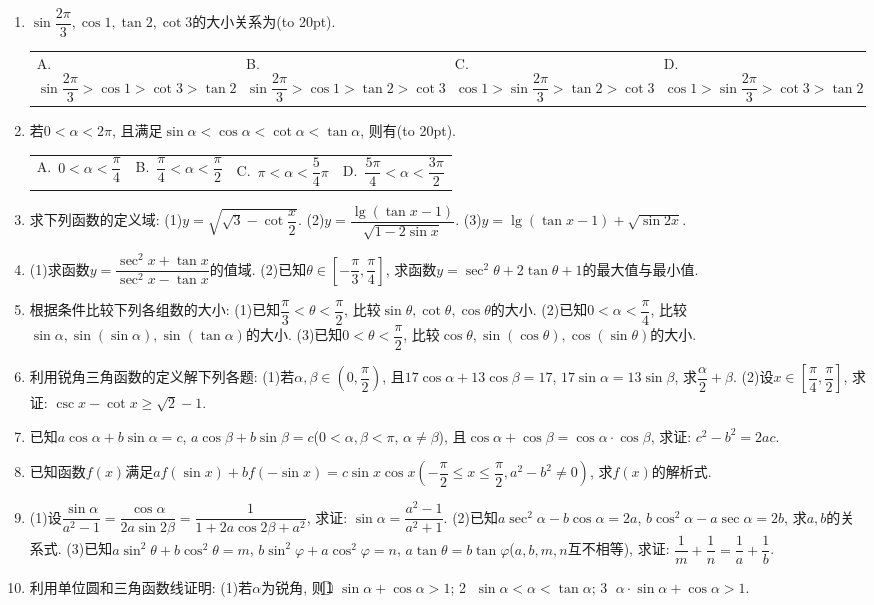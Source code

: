 \documentclass[10pt,a4paper]{article}
\newcommand{\bracket}[1]{(\hbox to #1pt{})}
\newcommand{\fourch}[4]{\par\begin{tabular}{p{.23\textwidth}p{.23\textwidth}p{.23\textwidth}p{.23\textwidth}}
A.~#1 &B.~#2& C.~#3& D.~#4
\end{tabular}}
\begin{document}
\begin{enumerate}[1.]
\item $\sin \dfrac{2\pi}3,\cos 1,\tan 2,\cot 3$的大小关系为\bracket{20}.
\fourch{$\sin \dfrac{2\pi}3>\cos 1>\cot 3>\tan 2$}{$\sin \dfrac{2\pi}3>\cos 1>\tan 2>\cot 3$}{$\cos 1>\sin \dfrac{2\pi}3>\tan 2>\cot 3$}{$\cos 1>\sin \dfrac{2\pi}3>\cot 3>\tan 2$}
\item 若$0<\alpha <2\pi$, 且满足$\sin \alpha <\cos \alpha <\cot \alpha <\tan \alpha$, 则有\bracket{20}.
\fourch{$0<\alpha <\dfrac{\pi}4$}{$\dfrac{\pi}4<\alpha <\dfrac{\pi}2$}{$\pi <\alpha <\dfrac 54\pi$}{$\dfrac{5\pi}4<\alpha <\dfrac{3\pi}2$}
\item 求下列函数的定义域:
(1)$y=\sqrt {\sqrt 3-\cot \dfrac x2}$.
(2)$y=\dfrac{\lg (\tan x-1)}{\sqrt {1-2\sin x}}$.
(3)$y=\lg (\tan x-1)+\sqrt {\sin 2x}$.
\item (1)求函数$y=\dfrac{\sec ^2x+\tan x}{\sec ^2x-\tan x}$的值域.
(2)已知$\theta \in [-\dfrac{\pi}3,\dfrac{\pi}4]$, 求函数$y=\sec ^2\theta +2\tan \theta +1$的最大值与最小值.
\item 根据条件比较下列各组数的大小:
(1)已知$\dfrac{\pi}3<\theta <\dfrac{\pi}2$, 比较$\sin \theta ,\cot \theta ,\cos \theta$的大小.
(2)已知$0<\alpha <\dfrac{\pi}4$, 比较$\sin \alpha ,\sin (\sin \alpha),\sin (\tan \alpha)$的大小.
(3)已知$0<\theta <\dfrac{\pi}2$, 比较$\cos \theta ,\sin (\cos \theta),\cos (\sin \theta)$的大小.
\item 利用锐角三角函数的定义解下列各题:
(1)若$\alpha ,\beta \in (0,\dfrac{\pi}2)$, 且$17\cos \alpha +13\cos \beta =17$, $17\sin \alpha =13\sin \beta$, 求$\dfrac{\alpha}2+\beta$.
(2)设$x\in [\dfrac{\pi}4,\dfrac{\pi}2]$, 求证: $\csc x-\cot x\ge \sqrt 2-1$.
\item 已知$a\cos \alpha +b\sin \alpha =c$, $a\cos \beta +b\sin \beta =c$($0<\alpha ,\beta <\pi$, $\alpha \ne \beta$), 且$\cos \alpha +\cos \beta =\cos \alpha \cdot \cos \beta$, 求证: $c^2-b^2=2ac$.
\item 已知函数$f(x)$满足$af(\sin x)+bf(-\sin x)=c\sin x\cos x(-\dfrac{\pi}2\le x\le \dfrac{\pi}2,a^2-b^2\ne 0)$, 求$f(x)$的解析式.
\item (1)设$\dfrac{\sin \alpha}{a^2-1}=\dfrac{\cos \alpha}{2a\sin 2\beta}=\dfrac 1{1+2a\cos 2\beta +a^2}$, 求证: $\sin \alpha =\dfrac{a^2-1}{a^2+1}$.
(2)已知$a\sec ^2\alpha -b\cos \alpha =2a$, $b\cos ^2\alpha -a\sec \alpha =2b$, 求$a,b$的关系式.
(3)已知$a\sin ^2\theta +b\cos ^2\theta =m$, $b\sin ^2\varphi +a\cos ^2\varphi =n$, $a\tan \theta =b\tan \varphi$($a,b,m,n$互不相等), 求证: $\dfrac 1m+\dfrac 1n=\dfrac 1a+\dfrac 1b$.
\item 利用单位圆和三角函数线证明:
(1)若$\alpha$为锐角, 则\textcircled{1} $\sin \alpha +\cos \alpha >1$; \textcircled{2} $\sin \alpha <\alpha <\tan \alpha$; \textcircled{3} $\alpha \cdot \sin \alpha +\cos \alpha >1$.

\end{enumerate}
\end{document}
